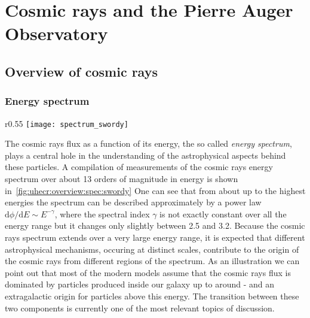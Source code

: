 \chapter{Cosmic rays and the Pierre Auger Observatory}
\label{sec:uhecr}


\cite{Mollerach:2017idb}

\section{Overview of cosmic rays}
\label{sec:uhecr:overview}

\subsection{Energy spectrum}

\begin{wrapfigure}{r}{0.55\textwidth}
  \centering
  \texttt{[image: spectrum\_swordy]}
  \caption{\cite{SwordyPlot2001}}
  \label{fig:uhecr:overview:spec:swordy}
\end{wrapfigure}

The cosmic rays flux as a function of its energy, the so called \emph{energy spectrum},
plays a central hole in the understanding of the astrophysical aspects behind these particles.
A compilation of measurements of the cosmic rays
energy spectrum over about 13 orders of magnitude
in energy is shown in~\cref{fig:uhecr:overview:spec:swordy}
One can see that from about  up to the highest energies
the spectrum can be described approximately 
by a power law $\text{d}\phi/\text{d}E \sim E^{-\gamma}$, where
the spectral index $\gamma$ is not exactly constant over all the energy range
but it changes only slightly between 2.5 and 3.2.
Because the cosmic rays spectrum extends over a very large
energy range, it is expected that different astrophysical mechanisms,
occuring at distinct scales, contribute to the origin
of the cosmic rays from different regions of the spectrum. As an illustration
we can point out that most of the modern models assume that the cosmic rays flux
is dominated by particles produced inside our galaxy up to around - and
an extragalactic origin for particles above this energy. The transition between
these two components is currently one of the most relevant topics of discussion.


